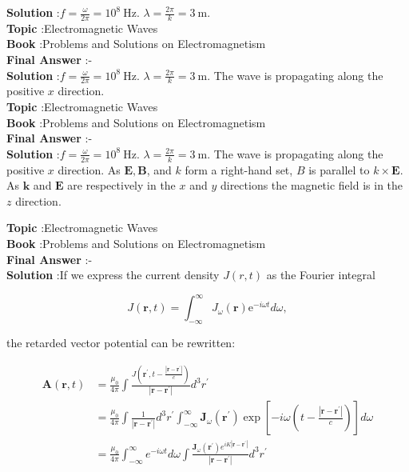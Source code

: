 \documentclass[10pt]{article}
\begin{document}
\textbf{Solution} :$f=\frac{\omega}{2 \pi}=10^{8} \mathrm{~Hz}$.
 $\lambda=\frac{2 \pi}{k}=3 \mathrm{~m}$.
\\
\textbf{Topic} :Electromagnetic Waves\\
\textbf{Book} :Problems and Solutions on Electromagnetism\\
\textbf{Final Answer} :\pi-\arctan {}\\


\textbf{Solution} :$f=\frac{\omega}{2 \pi}=10^{8} \mathrm{~Hz}$.
 $\lambda=\frac{2 \pi}{k}=3 \mathrm{~m}$.
 The wave is propagating along the positive $x$ direction.
\\
\textbf{Topic} :Electromagnetic Waves\\
\textbf{Book} :Problems and Solutions on Electromagnetism\\
\textbf{Final Answer} :\pi-\arctan {}\\


\textbf{Solution} :$f=\frac{\omega}{2 \pi}=10^{8} \mathrm{~Hz}$.
 $\lambda=\frac{2 \pi}{k}=3 \mathrm{~m}$.
 The wave is propagating along the positive $x$ direction.
 As $\mathbf{E}, \mathbf{B}$, and $k$ form a right-hand set, $B$ is parallel to $k \times \mathbf{E}$. As $\mathbf{k}$ and $\mathbf{E}$ are respectively in the $x$ and $y$ directions the magnetic field is in the $z$ direction.

\textbf{Topic} :Electromagnetic Waves\\
\textbf{Book} :Problems and Solutions on Electromagnetism\\
\textbf{Final Answer} :\pi-\arctan {}\\


\textbf{Solution} :If we express the current density $J(r, t)$ as the Fourier integral

$$
J(\mathbf{r}, t)=\int_{-\infty}^{\infty} J_{\omega}(\mathbf{r}) \mathrm{e}^{-i \omega t} d \omega,
$$

the retarded vector potential can be rewritten:

$$
\begin{aligned}
\mathbf{A}(\mathbf{r}, t) &=\frac{\mu_{0}}{4 \pi} \int \frac{J\left(\mathbf{r}^{\prime}, t-\frac{\left|\mathbf{r}-\mathbf{r}^{\prime}\right|}{c}\right)}{\left|\mathbf{r}-\mathbf{r}^{\prime}\right|} d^{3} r^{\prime} \\
&=\frac{\mu_{0}}{4 \pi} \int \frac{1}{\left|\mathbf{r}-\mathbf{r}^{\prime}\right|} d^{3} r^{\prime} \int_{-\infty}^{\infty} \mathbf{J}_{\omega}\left(\mathbf{r}^{\prime}\right) \exp \left[-i \omega\left(t-\frac{\left|\mathbf{r}-\mathbf{r}^{\prime}\right|}{c}\right)\right] d \omega \\
&=\frac{\mu_{0}}{4 \pi} \int_{-\infty}^{\infty} e^{-i \omega t} d \omega \int \frac{\mathbf{J}_{\omega}\left(\mathbf{r}^{\prime}\right) e^{i K\left|\mathbf{r}-\mathbf{r}^{\prime}\right|}}{\left|\mathbf{r}-\mathbf{r}^{\prime}\right|} d^{3} r^{\prime}
\end{aligned}
$$
\end{document}
